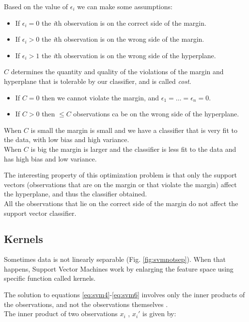 Based on the value of $\epsilon_i$ we can make some assumptions:
\begin{itemize}[noitemsep]
	\item If $\epsilon_i = 0$ the \textit{i}th observation is on the correct side of the margin.
	\item If $\epsilon_i > 0$ the \textit{i}th observation is on the wrong side of the margin.
	\item If $\epsilon_i > 1$ the \textit{i}th observation is on the wrong side of the hyperplane.
\end{itemize}

$C$ determines the quantity and quality of the violations of the margin and hyperplane that is tolerable by our classifier, and is called \textit{cost}.
\begin{itemize}[noitemsep]
	\item If $C = 0$ then we cannot violate the margin, and $\epsilon_1 = \dots = \epsilon_n = 0$.
	\item If $C > 0$ then $\le C$ observations ca be on the wrong side of the hyperplane.
\end{itemize} 

When $C$ is small the margin is small and we have a classifier that is very fit to the data, with low bias and high variance. \\
When $C$ is big the margin is larger and the classifier is less fit to the data and has high bias and low variance.

The interesting property of this optimization problem is that only the support vectors (observations that are on the margin or that violate the margin) affect the hyperplane, and thus the classifier obtained. \\
All the observations that lie on the correct side of the margin do not affect the support vector classifier.

\subsection{Kernels}
Sometimes data is not linearly separable (Fig. \ref{fig:svmnotsep}). When that happens, Support Vector Machines work by enlarging the feature space using specific function called kernels.

The solution to equations \ref{eq:svm4}-\ref{eq:svm6} involves only the inner products of the observations, and not the observations themselves \cite{ISLR}.\\
The inner product of two observations $x_i$ , $x_i'$ is given by:

